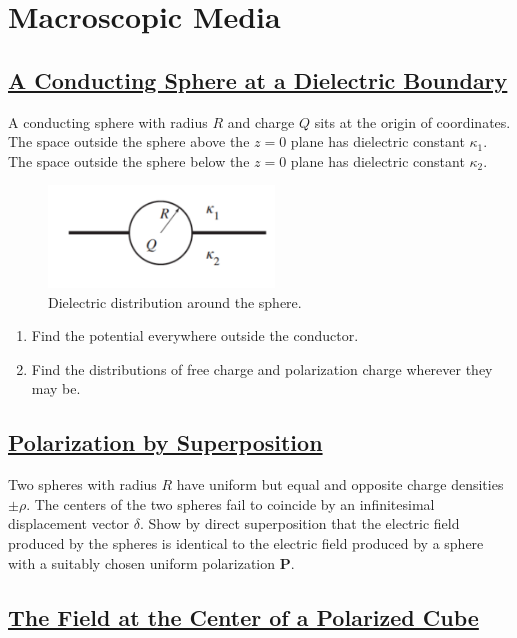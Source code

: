 \section{Macroscopic Media}

\subsection{\hyperref[A Conducting Sphere at a Dielectric Boundary]{A Conducting Sphere at a Dielectric Boundary}}

A conducting sphere with radius $R$ and charge $Q$ sits at the origin of coordinates. The space outside the sphere above the $z=0$ plane has dielectric constant $\kappa_{1}$. The space outside the sphere below the $z=0$ plane has dielectric constant $\kappa_{2}$.

\begin{figure}[h]
	\includegraphics[width=6cm]{figures/spheredielectric.png}
	\centering
	\caption{Dielectric distribution around the sphere.}
\end{figure}

\begin{enumerate}
	\item  Find the potential everywhere outside the conductor.
	\item  Find the distributions of free charge and polarization charge wherever they may be.
\end{enumerate}

\subsection{\hyperref[Polarization by Superposition]{Polarization by Superposition}}

Two spheres with radius $R$ have uniform but equal and opposite charge densities $\pm \rho .$ The centers of the two spheres fail to coincide by an infinitesimal displacement vector $\delta$. Show by direct superposition that the electric field produced by the spheres is identical to the electric field produced by a sphere with a suitably chosen uniform polarization $\mathbf{P}$.

\subsection{\hyperref[The Field at the Center of a Polarized Cube]{The Field at the Center of a Polarized Cube}}

